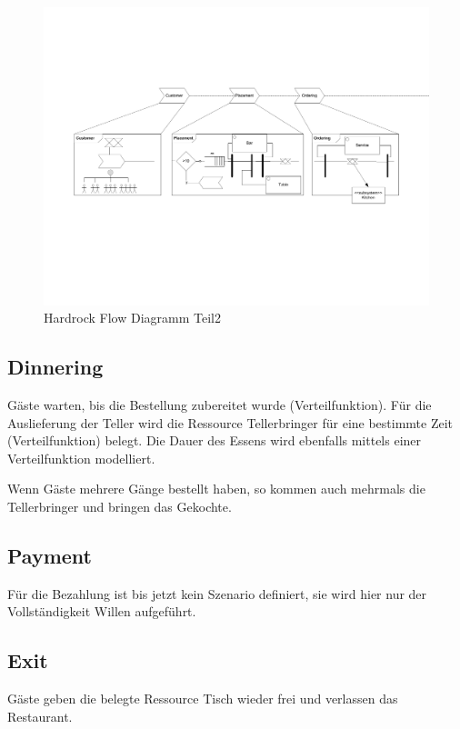 \documentclass[ngerman,a4paper,12pt]{scrreprt}
\begin{document}
\begin{landscape}
		\begin{figure}[H]
				\includegraphics[page=2,trim=0cm 7cm 2cm 5cm, clip=true,width=1.4\textwidth]{../model/Modell_v2.pdf}
				\caption[Hardrock Flow Diagramm Teil2]{Hardrock Flow Diagramm Teil2}
				\label{flowDiagramm2}
		\end{figure}
		
		\subsection{Dinnering}
		Gäste warten, bis die Bestellung zubereitet wurde (Verteilfunktion). Für die Auslieferung der Teller wird die Ressource Tellerbringer für eine bestimmte Zeit (Verteilfunktion) belegt. Die Dauer des Essens wird ebenfalls mittels einer Verteilfunktion modelliert.
		
		Wenn Gäste mehrere Gänge bestellt haben, so kommen auch mehrmals die Tellerbringer und bringen das Gekochte.
		
		\subsection{Payment}
		Für die Bezahlung ist bis jetzt kein Szenario definiert, sie wird hier nur der Vollständigkeit Willen aufgeführt.
		
		\subsection{Exit}
		Gäste geben die belegte Ressource Tisch wieder frei und verlassen das Restaurant.
		

\end{landscape}
\end{document}
